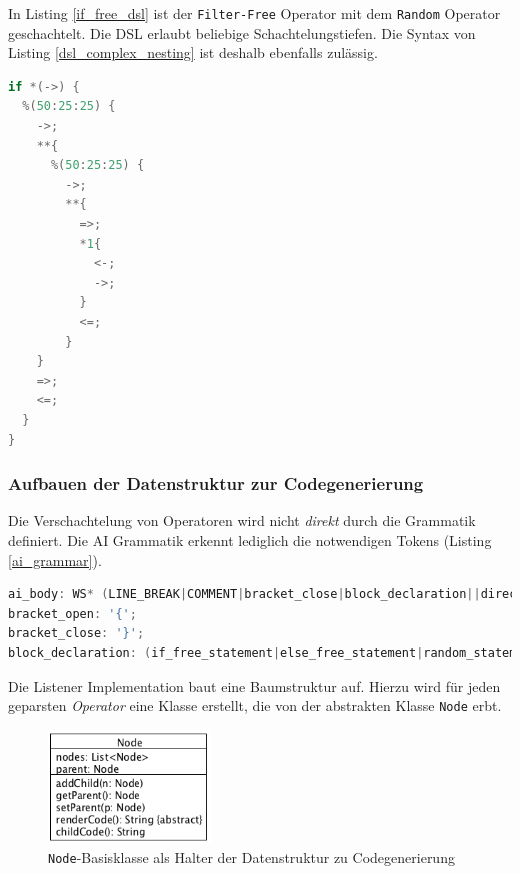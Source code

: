 \documentclass[conference]{IEEEtran}
\begin{document}
In Listing \ref{if_free_dsl} ist der \texttt{Filter-Free} Operator mit dem \texttt{Random} Operator geschachtelt. Die DSL erlaubt beliebige Schachtelungstiefen. Die Syntax von Listing \ref{dsl_complex_nesting} ist deshalb ebenfalls zulässig.

\begin{lstlisting}[language=Java, captionpos=b, caption=Komplexere Verschachtelung in AI DSL, label=dsl_complex_nesting]
if *(->) {
  %(50:25:25) {
    ->;
    **{
      %(50:25:25) {
        ->;
        **{
          =>;
          *1{
            <-;
            ->;
          }
          <=;
        }
    }
    =>;
    <=;
  }
}
\end{lstlisting}

\subsubsection{Aufbauen der Datenstruktur zur Codegenerierung}

Die Verschachtelung von Operatoren wird nicht \emph{direkt} durch die Grammatik definiert. Die AI Grammatik erkennt lediglich die notwendigen Tokens (Listing \ref{ai_grammar}).

\begin{lstlisting}[language=Java, captionpos=b, caption=Ausschnitt der AI Grammatik, label=ai_grammar]
ai_body: WS* (LINE_BREAK|COMMENT|bracket_close|block_declaration||direction_statement);
bracket_open: '{';
bracket_close: '}';
block_declaration: (if_free_statement|else_free_statement|random_statement|leave_free_statement|get_nth_free_statement);
\end{lstlisting}

Die Listener Implementation baut eine Baumstruktur auf. Hierzu wird für jeden geparsten \emph{Operator} eine Klasse erstellt, die von der abstrakten Klasse \texttt{Node} erbt.


\begin{figure}[!htb]
\centering
\includegraphics[width=1.7in]{node_structure_node.png}

\caption{\texttt{Node}-Basisklasse als Halter der Datenstruktur zu Codegenerierung}
\label{node_class}
\end{figure}
\end{document}
